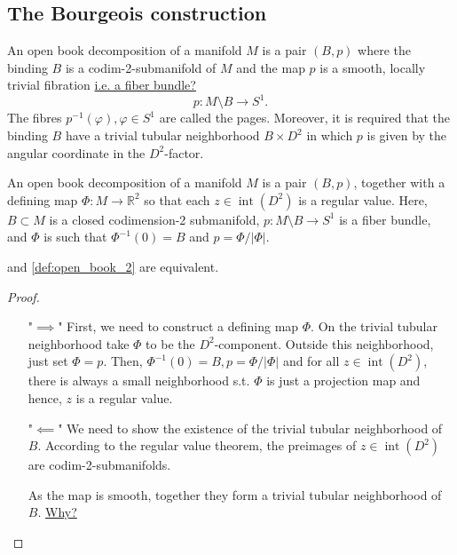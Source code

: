 \subsection*{The Bourgeois construction}

\begin{definition}\label{def:open_book_1}
    An open book decomposition of a manifold $M$ is a pair $(B,p)$ where the binding $B$ is a codim-2-submanifold of $M$ and the map $p$ is a smooth, locally trivial fibration \underline{i.e. a fiber bundle?}
    \[
        p: M\setminus B \to S^1.
    \]
    The fibres $p^{-1}(\varphi), \varphi \in S^1$ are called the pages.
    Moreover, it is required that the binding $B$ have a trivial tubular neighborhood $B\times D^2$ in which $p$ is given by the angular coordinate in the $D^2$-factor.
\end{definition}

\begin{definition}\label{def:open_book_2}
    An open book decomposition of a manifold $M$ is a pair $(B, p)$, together with a defining map $\Phi:M \to \mathbb R^2$ so that each $z \in \operatorname{int}(D^2)$ is a regular value.
    Here, $B \subset M$ is a closed codimension-2 submanifold, $p: M\setminus B \to S^1$ is a fiber bundle, and $\Phi$ is such that $\Phi^{-1}(0) = B$ and $p =  \Phi / |\Phi|$.
\end{definition}

\begin{lemma}
     and \cref{def:open_book_2} are equivalent.
\end{lemma}
\begin{proof}
\ 
    \begin{itemize}
        \item["$\implies$"] First, we need to construct a defining map $\Phi$. On the trivial tubular neighborhood take $\Phi$ to be the $D^2$-component. Outside this neighborhood, just set $\Phi = p$.
        Then, $\Phi^{-1}(0) = B, p = \Phi/|\Phi|$ and for all $z \in \operatorname{int}(D^2)$, there is always a small neighborhood s.t. $\Phi$ is just a projection map and hence, $z$ is a regular value.
        \item["$\impliedby$"] We need to show the existence of the trivial tubular neighborhood of $B$.
        According to the regular value theorem, the preimages of $z\in \operatorname{int}(D^2)$ are codim-2-submanifolds.

        As the map is smooth, together they form a trivial tubular neighborhood of $B$. \underline{Why?}
    \end{itemize}
\end{proof}

